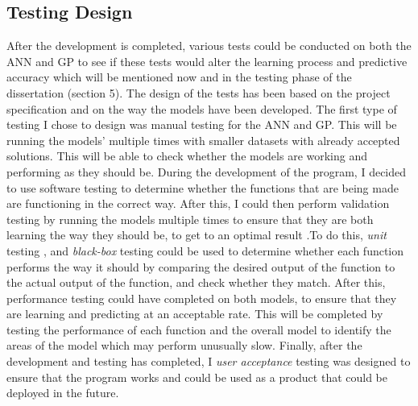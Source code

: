 \documentclass[11pt]{article}
\begin{document}
\subsection{Testing Design}
After the development is completed, various tests could be conducted on both the ANN and GP to see if these tests would alter the learning process and predictive accuracy which will be mentioned now and in the testing phase of the dissertation (section 5). The design of the tests has been based on the project specification and on the way the models have been developed. 
The first type of testing I chose to design was manual testing for the ANN and GP. This will be running  the models' multiple times with smaller datasets with already accepted solutions. This will be able to check whether the models are working and performing as they should be. 
During the development of the program, I decided to use software testing to determine whether the functions that are being made are functioning in the correct way. After this, I could then perform validation testing by running the models multiple times to ensure that they are both learning the way they should be, to get to an optimal result .To do this, \textit{unit} testing , and \textit{black-box} testing could be used to determine whether each function performs the way it should by comparing the desired output of the function to the actual output of the function, and check whether they match. After this, performance testing could have completed on both models, to ensure that they are learning and predicting at an acceptable rate. This will be completed by testing the performance of each function and the overall model to identify the areas of the model which may perform unusually slow. Finally, after the development and testing has completed, I \textit{user acceptance} testing was designed to ensure that the program works and could be used as a product that could be deployed in the future. 
\end{document}
